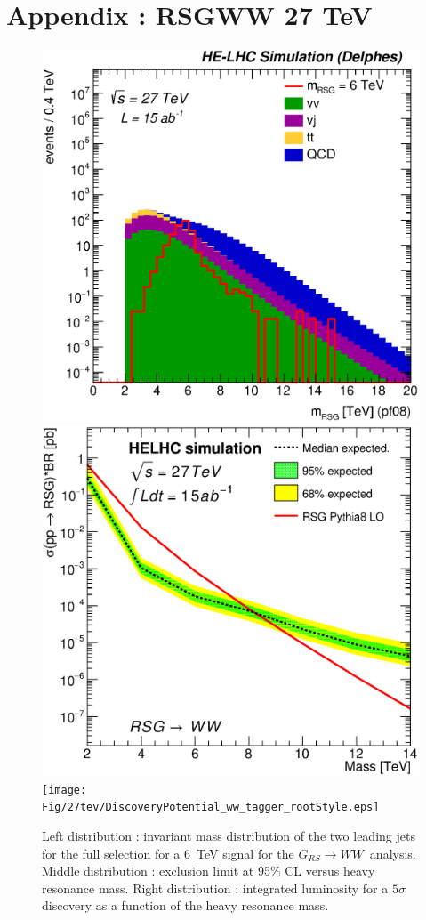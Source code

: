 \documentclass{cernrep}
\newcommand*{\rsg}{\ensuremath{G_{RS} \rightarrow WW}}
\begin{document}
\begin{table}[!htb]\centering
{}
\caption{Final yield of analysis.}
\label{tab:ZpttYield27}
\end{table}

\clearpage
\newpage

\section{Appendix : RSGWW 27 TeV}
\label{appendix:rsgww27}

\begin{figure}[!htb]
  \centering
  \includegraphics[width=0.30\columnwidth]{Fig/27tev/RSGWW_Mj1j2_pf08_fit_sel4_nostack_log.eps}
  \includegraphics[width=0.30\columnwidth]{Fig/27tev/lim_RSGraviton_ww_helhc_v01.eps}
  \texttt{[image: Fig/27tev/DiscoveryPotential\_ww\_tagger\_rootStyle.eps]}
  \caption{Left distribution : invariant mass distribution of the two leading jets for the full selection for a 6~TeV signal for the \rsg\ analysis. Middle distribution : exclusion limit at 95\% CL versus heavy resonance mass. Right distribution : integrated luminosity for a $5\sigma$ discovery as a function of the heavy resonance mass.}
  \label{figure:hadronicresonances27:wwsel04}
\end{figure}
\end{document}
